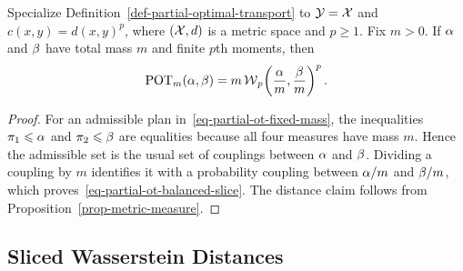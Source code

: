 \begin{prop}\label{prop-partial-ot-metric-slice}
Specialize Definition~\ref{def-partial-optimal-transport} to $\mathcal{Y}=\mathcal{X}$ and $c(x,y)=d(x,y)^p$, where $(\mathcal{X},d)$ is a metric space and $p\geq1$. Fix $m>0$. If $\alpha$ and $\beta$ have total mass $m$ and finite $p$th moments, then
\begin{equation}\label{eq-partial-ot-balanced-slice}
\operatorname{POT}_m(\alpha,\beta)
=
m\operatorname{\mathcal{W}}_p\!\left(\frac{\alpha}{m},\frac{\beta}{m}\right)^p.
\end{equation}
\end{prop}
\begin{proof}
For an admissible plan in~\eqref{eq-partial-ot-fixed-mass}, the inequalities $\pi_1\leqslant\alpha$ and $\pi_2\leqslant\beta$ are equalities because all four measures have mass $m$. Hence the admissible set is the usual set of couplings between $\alpha$ and $\beta$. Dividing a coupling by $m$ identifies it with a probability coupling between $\alpha/m$ and $\beta/m$, which proves~\eqref{eq-partial-ot-balanced-slice}. The distance claim follows from Proposition~\ref{prop-metric-measure}.
\end{proof}
\subsection{Sliced Wasserstein Distances}
\label{sec-sliced-wasserstein}

